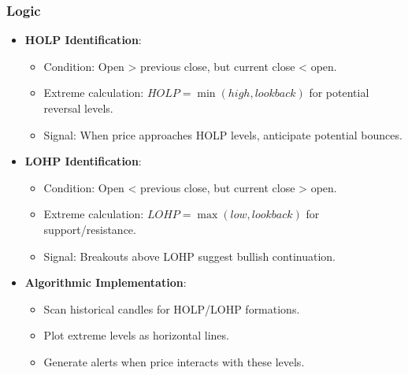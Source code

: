 \documentclass[12pt]{article}
\begin{document}
\subsubsection{Logic}
\begin{itemize}
\item \textbf{HOLP Identification}:
  \begin{itemize}
  \item Condition: Open > previous close, but current close < open.
  \item Extreme calculation: \( HOLP = \min(high, lookback) \) for potential reversal levels.
  \item Signal: When price approaches HOLP levels, anticipate potential bounces.
  \end{itemize}
\item \textbf{LOHP Identification}:
  \begin{itemize}
  \item Condition: Open < previous close, but current close > open.
  \item Extreme calculation: \( LOHP = \max(low, lookback) \) for support/resistance.
  \item Signal: Breakouts above LOHP suggest bullish continuation.
  \end{itemize}
\item \textbf{Algorithmic Implementation}:
  \begin{itemize}
  \item Scan historical candles for HOLP/LOHP formations.
  \item Plot extreme levels as horizontal lines.
  \item Generate alerts when price interacts with these levels.
  \end{itemize}
\end{itemize}
\end{document}
